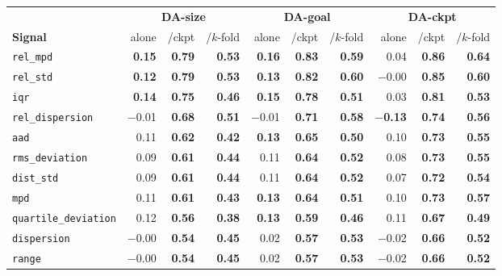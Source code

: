 \begin{table}[h]
\centering
\scriptsize
\begin{tabular}{@{}lrrrrrrrrr@{}}
\toprule
 & \multicolumn{3}{c}{\textbf{DA-size}} & \multicolumn{3}{c}{\textbf{DA-goal}} & \multicolumn{3}{c}{\textbf{DA-ckpt}} \\
\cmidrule(lr){2-4}\cmidrule(lr){5-7}\cmidrule(lr){8-10}
\textbf{Signal} & alone & /ckpt & /$k$-fold & alone & /ckpt & /$k$-fold & alone & /ckpt & /$k$-fold \\
\midrule
\texttt{rel\_mpd} & \textbf{0.15} & \textbf{0.79} & \textbf{0.53} & \textbf{0.16} & \textbf{0.83} & \textbf{0.59} & 0.04 & \textbf{0.86} & \textbf{0.64} \\
\texttt{rel\_std} & \textbf{0.12} & \textbf{0.79} & \textbf{0.53} & \textbf{0.13} & \textbf{0.82} & \textbf{0.60} & $-$0.00 & \textbf{0.85} & \textbf{0.60} \\
\texttt{iqr} & \textbf{0.14} & \textbf{0.75} & \textbf{0.46} & \textbf{0.15} & \textbf{0.78} & \textbf{0.51} & 0.03 & \textbf{0.81} & \textbf{0.53} \\
\texttt{rel\_dispersion} & $-$0.01 & \textbf{0.68} & \textbf{0.51} & $-$0.01 & \textbf{0.71} & \textbf{0.58} & \textbf{$-$0.13} & \textbf{0.74} & \textbf{0.56} \\
\texttt{aad} & 0.11 & \textbf{0.62} & \textbf{0.42} & \textbf{0.13} & \textbf{0.65} & \textbf{0.50} & 0.10 & \textbf{0.73} & \textbf{0.55} \\
\texttt{rms\_deviation} & 0.09 & \textbf{0.61} & \textbf{0.44} & 0.11 & \textbf{0.64} & \textbf{0.52} & 0.08 & \textbf{0.73} & \textbf{0.55} \\
\texttt{dist\_std} & 0.09 & \textbf{0.61} & \textbf{0.44} & 0.11 & \textbf{0.64} & \textbf{0.52} & 0.07 & \textbf{0.72} & \textbf{0.54} \\
\texttt{mpd} & 0.11 & \textbf{0.61} & \textbf{0.43} & \textbf{0.13} & \textbf{0.64} & \textbf{0.51} & 0.10 & \textbf{0.73} & \textbf{0.57} \\
\texttt{quartile\_deviation} & 0.12 & \textbf{0.56} & \textbf{0.38} & \textbf{0.13} & \textbf{0.59} & \textbf{0.46} & 0.11 & \textbf{0.67} & \textbf{0.49} \\
\texttt{dispersion} & $-$0.00 & \textbf{0.54} & \textbf{0.45} & 0.02 & \textbf{0.57} & \textbf{0.53} & $-$0.02 & \textbf{0.66} & \textbf{0.52} \\
\texttt{range} & $-$0.00 & \textbf{0.54} & \textbf{0.45} & 0.02 & \textbf{0.57} & \textbf{0.53} & $-$0.02 & \textbf{0.66} & \textbf{0.52} \\

\end{tabular}
\end{table}
